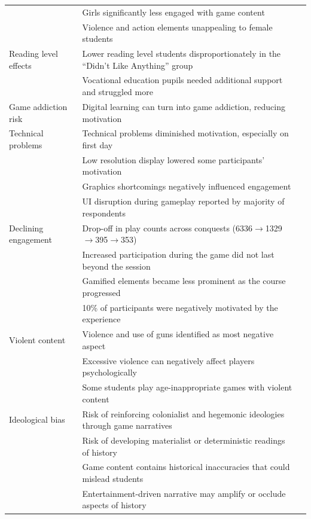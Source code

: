 \documentclass[a4paper,fleqn]{cas-sc}
\begin{document}
\begin{longtable}{|p{}|p{}|l|}
 & Girls significantly less engaged with game content & \citet{61Karsenti202027} \\
 & Violence and action elements unappealing to female students & \citet{8Yu2014} \\
\hline
Reading level effects & Lower reading level students disproportionately in the ``Didn't Like Anything'' group & \citet{15Slater2022} \\
 & Vocational education pupils needed additional support and struggled more & \citet{49Huizenga2007127} \\
\hline
Game addiction risk & Digital learning can turn into game addiction, reducing motivation & \citet{52Lin2011265, 67Lin201296} \\
\hline
Technical problems & Technical problems diminished motivation, especially on first day & \citet{49Huizenga2007127} \\
 & Low resolution display lowered some participants' motivation & \citet{50Lye2013} \\
 & Graphics shortcomings negatively influenced engagement & \citet{69Wong2017150} \\
 & UI disruption during gameplay reported by majority of respondents & \citet{22Nugroho2020149} \\
\hline
Declining engagement & Drop-off in play counts across conquests (6336$\to$1329$\to$395$\to$353) & \citet{47Clara2010156} \\
 & Increased participation during the game did not last beyond the session & \citet{60Hoy2018} \\
 & Gamified elements became less prominent as the course progressed & \citet{36Scholz2021} \\
 & 10\% of participants were negatively motivated by the experience & \citet{6Czerwinski2018} \\
\hline
Violent content & Violence and use of guns identified as most negative aspect & \citet{65Razak201139} \\
 & Excessive violence can negatively affect players psychologically & \citet{20Erandaru2014} \\
 & Some students play age-inappropriate games with violent content & \citet{4Cruz2017} \\
\hline
Ideological bias & Risk of reinforcing colonialist and hegemonic ideologies through game narratives & \citet{46Stirling2022} \\
 & Risk of developing materialist or deterministic readings of history & \citet{55Squire2004} \\
 & Game content contains historical inaccuracies that could mislead students & \citet{61Karsenti202027} \\
 & Entertainment-driven narrative may amplify or occlude aspects of history & \citet{12Gilbert2019108} \\
\end{longtable}
\end{document}
